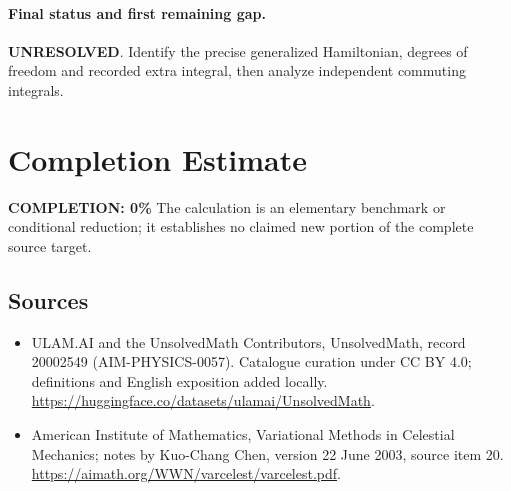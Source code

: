 \documentclass[11pt]{article}
\begin{document}
\paragraph{Final status and first remaining gap.}
\textbf{UNRESOLVED}. Identify the precise generalized Hamiltonian, degrees of freedom and recorded extra integral, then analyze independent commuting integrals.

\section{Completion Estimate}
\noindent\textbf{COMPLETION: 0\%}
The calculation is an elementary benchmark or conditional reduction; it establishes no claimed new portion of the complete source target.

\subsection{Sources}
\begin{itemize}
\item[\hypertarget{source:20002549:1}{S1}] ULAM.AI and the UnsolvedMath Contributors, UnsolvedMath, record 20002549 (AIM-PHYSICS-0057). Catalogue curation under CC BY 4.0; definitions and English exposition added locally.
\url{https://huggingface.co/datasets/ulamai/UnsolvedMath}.
\item[\hypertarget{source:20002549:2}{S2}] American Institute of Mathematics, Variational Methods in Celestial Mechanics; notes by Kuo-Chang Chen, version 22 June 2003, source item 20.
\url{https://aimath.org/WWN/varcelest/varcelest.pdf}.
\end{itemize}
\label{end:20002549}
\end{document}
